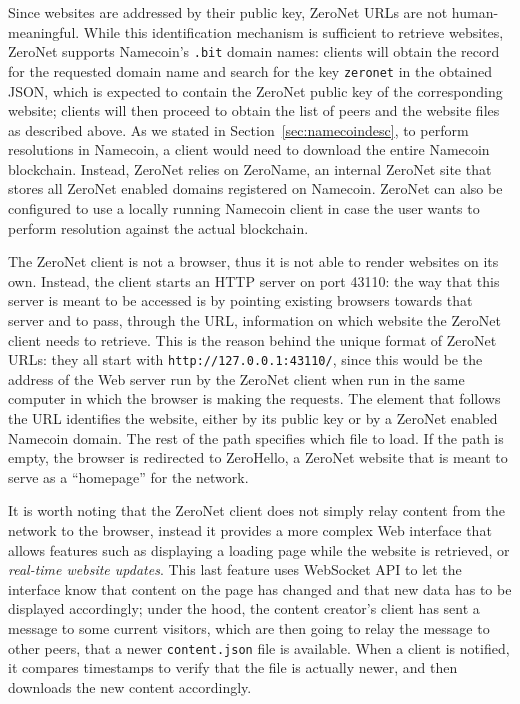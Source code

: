 \documentclass[mscthesis]{usiinfthesis}
\begin{document}
Since websites are addressed by their public key, ZeroNet URLs are not human-meaningful. While this identification mechanism is sufficient to retrieve websites, ZeroNet supports Namecoin's \texttt{.bit} domain names: clients will obtain the record for the requested domain name and search for the key \texttt{zeronet} in the obtained JSON, which is expected to contain the ZeroNet public key of the corresponding website; clients will then proceed to obtain the list of peers and the website files as described above. As we stated in Section~\ref{sec:namecoindesc}, to perform resolutions in Namecoin, a client would need to download the entire Namecoin blockchain. Instead, ZeroNet relies on ZeroName, an internal ZeroNet site that stores all ZeroNet enabled domains registered on Namecoin. ZeroNet can also be configured to use a locally running Namecoin client in case the user wants to perform resolution against the actual blockchain.

The ZeroNet client is not a browser, thus it is not able to render websites on its own. Instead, the client starts an HTTP server on port 43110: the way that this server is meant to be accessed is by pointing existing browsers towards that server and to pass, through the URL, information on which website the ZeroNet client needs to retrieve. This is the reason behind the unique format of ZeroNet URLs: they all start with \texttt{http://127.0.0.1:43110/}, since this would be the address of the Web server run by the ZeroNet client when run in the same computer in which the browser is making the requests. The element that follows the URL identifies the website, either by its public key or by a ZeroNet enabled Namecoin domain. The rest of the path specifies which file to load. If the path is empty, the browser is redirected to ZeroHello, a ZeroNet website that is meant to serve as a ``homepage'' for the network.

It is worth noting that the ZeroNet client does not simply relay content from the network to the browser, instead it provides a more complex Web interface that allows features such as displaying a loading page while the website is retrieved, or \emph{real-time website updates}. This last feature uses WebSocket API to let the interface know that content on the page has changed and that new data has to be displayed accordingly; under the hood, the content creator's client has sent a message to some current visitors, which are then going to relay the message to other peers, that a newer \texttt{content.json} file is available. When a client is notified, it compares timestamps to verify that the file is actually newer, and then downloads the new content accordingly.
\end{document}
